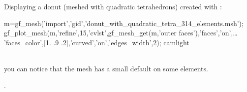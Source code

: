 \begin{cmdexamples}
  Displaying a donut  (meshed with quadratic tetrahedrons) created with :
  \begin{mcode}
m=gf_mesh('import','gid','donut_with_quadratic_tetra_314_elements.msh');
gf_plot_mesh(m,'refine',15,'cvlst',gf_mesh_get(m,'outer faces'),'faces','on',\ldots
'faces_color',[1. .9 .2],'curved','on','edges_width',2); 
camlight %
  \end{mcode}
  \begin{center}
    \\
    you can notice that the mesh has a small default on some elements.
  \end{center}
\end{cmdexamples}
\begin{gfseealso}
  .
\end{gfseealso}
\newpage


